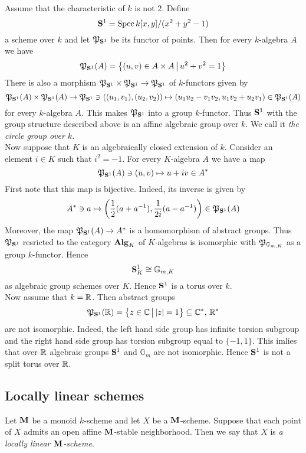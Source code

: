 \begin{example}\label{example:non_split_torus}
Assume that the characteristic of $k$ is not $2$. Define
$$\mathbf{S}^1 = \mathrm{Spec}\, k[x,y]/(x^2+y^2-1)$$
a scheme over $k$ and let ${\mathfrak P}_{\mathbf{S}^1}$ be its functor of points. Then for every $k$-algebra $A$ we have
$${\mathfrak P}_{\mathbf{S}^1}(A) = \big\{(u,v)\in A\times A\,\big|\,u^2+v^2=1\big\}$$
There is also a morphism ${\mathfrak P}_{\mathbf{S}^1}\times {\mathfrak P}_{\mathbf{S}^1}\rightarrow {\mathfrak P}_{\mathbf{S}^1}$ of $k$-functors given by
$${\mathfrak P}_{\mathbf{S}^1}(A)\times {\mathfrak P}_{\mathbf{S}^1}(A)\rightarrow {\mathfrak P}_{\mathbf{S}^1}\ni \left((u_1,v_1),(u_2,v_2)\right)\mapsto (u_1u_2-v_1v_2,u_1v_2+u_2v_1)\in {\mathfrak P}_{\mathbf{S}^1}(A)$$
for every $k$-algebra $A$. This makes ${\mathfrak P}_{\mathbf{S}^1}$ into a group $k$-functor. Thus $\mathbf{S}^1$ with the group structure described above is an affine algebraic group over $k$. We call it \textit{the circle group over $k$}.\\
Now suppose that $K$ is an algebraically closed extension of $k$. Consider an element $i\in K$ such that $i^2 = -1$. For every $K$-algebra $A$ we have a map
$${\mathfrak P}_{\mathbf{S}^1}(A)\ni (u,v)\mapsto u+iv\in A^*$$
First note that this map is bijective. Indeed, its inverse is given by
$$A^*\ni a \mapsto \left(\frac{1}{2}(a+a^{-1}),\frac{1}{2i}(a-a^{-1})\right) \in {\mathfrak P}_{\mathbf{S}^1}(A)$$
Moreover, the map ${\mathfrak P}_{\mathbf{S}^1}(A)\rightarrow A^*$ is a homomorphism of abstract groups. Thus ${\mathfrak P}_{\mathbf{S}^1}$ resricted to the category $\mathbf{Alg}_K$ of $K$-algebras is isomorphic with ${\mathfrak P}_{\mathbb{G}_{m,K}}$ as a group $k$-functor. Hence
$$\mathbf{S}^1_K \cong \mathbb{G}_{m,K}$$
as algebraic group schemes over $K$. Hence $\mathbf{S}^1$ is a torus over $k$.\\
Now assume that $k = {\mathbb R}$. Then abstract groups
$${\mathfrak P}_{\mathbf{S}^1}({\mathbb R}) = \big\{z\in {\mathbb C}\,\big|\,|z|=1\big\} \subseteq {\mathbb C}^*,\,{\mathbb R}^*$$
are not isomorphic. Indeed, the left hand side group has infinite torsion subgroup and the right hand side group has torsion subgroup equal to $\{-1,1\}$. This imlies that over ${\mathbb R}$ algebraic groups $\mathbf{S}^1$ and $\mathbb{G}_{m}$ are not isomorphic. Hence $\mathbf{S}^1$ is not a split torus over ${\mathbb R}$.
\end{example}

\subsection{Locally linear schemes}

\begin{definition}
Let $\mathbf{M}$ be a monoid $k$-scheme and let $X$ be a $\mathbf{M}$-scheme. Suppose that each point of $X$ admits an open affine $\mathbf{M}$-stable neighborhood. Then we say that $X$ is \textit{a locally linear $\mathbf{M}$-scheme}.
\end{definition}

